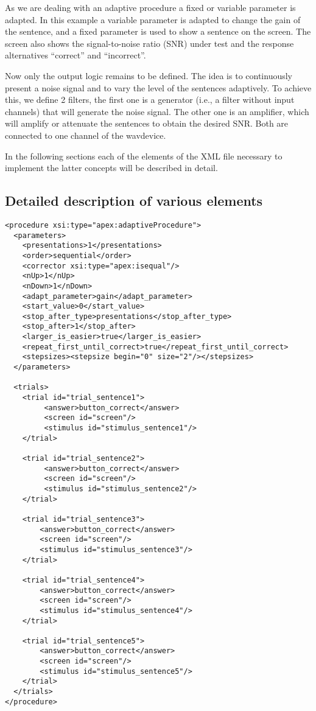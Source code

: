 As we are dealing with an adaptive procedure a fixed or variable
parameter is adapted. In this example a variable parameter is
adapted to change the gain of the sentence, and a fixed parameter
is used to show a sentence on the screen. The screen also shows
the signal-to-noise ratio (SNR) under test and the response
alternatives ``correct'' and ``incorrect''.

Now only the output logic remains to be defined. The idea is to
continuously present a noise signal and to vary the level of the
sentences adaptively. To achieve this, we define 2 filters, the
first one is a generator (i.e., a filter without input channels)
that will generate the noise signal. The other one is an
amplifier, which will amplify or attenuate the sentences to obtain
the desired SNR. Both are connected to one channel of the
wavdevice.

In the following sections each of the elements of the XML file
necessary to implement the latter concepts will be described in
detail.

\subsection{Detailed description of various elements}

\begin{lstlisting}
<procedure xsi:type="apex:adaptiveProcedure">
  <parameters>
    <presentations>1</presentations>
    <order>sequential</order>
    <corrector xsi:type="apex:isequal"/>
    <nUp>1</nUp>
    <nDown>1</nDown>
    <adapt_parameter>gain</adapt_parameter>
    <start_value>0</start_value>
    <stop_after_type>presentations</stop_after_type>
    <stop_after>1</stop_after>
    <larger_is_easier>true</larger_is_easier>
    <repeat_first_until_correct>true</repeat_first_until_correct>
    <stepsizes><stepsize begin="0" size="2"/></stepsizes>
  </parameters>

  <trials>
    <trial id="trial_sentence1">
         <answer>button_correct</answer>
         <screen id="screen"/>
         <stimulus id="stimulus_sentence1"/>
    </trial>

    <trial id="trial_sentence2">
         <answer>button_correct</answer>
         <screen id="screen"/>
         <stimulus id="stimulus_sentence2"/>
    </trial>

    <trial id="trial_sentence3">
        <answer>button_correct</answer>
        <screen id="screen"/>
        <stimulus id="stimulus_sentence3"/>
    </trial>

    <trial id="trial_sentence4">
        <answer>button_correct</answer>
        <screen id="screen"/>
        <stimulus id="stimulus_sentence4"/>
    </trial>

    <trial id="trial_sentence5">
        <answer>button_correct</answer>
        <screen id="screen"/>
        <stimulus id="stimulus_sentence5"/>
    </trial>
  </trials>
</procedure>
\end{lstlisting}



